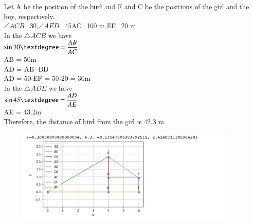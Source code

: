 \documentclass[journal,12pt,twocolumn]{IEEEtran}
\renewcommand\thesection{\arabic{section}}
\begin{document}
\begin{enumerate}[label=\thesection.\arabic*.,ref=\thesection.\theenumi]
\solution Let A be the position of the bird and E and C be the positions of the girl and the boy, respectively. \\

$\angle ACB$=30\textdegree ,$\angle AED$=45\textdegree AC=100 m,EF=20 m \\

In the $\triangle ACB$ we have\\

$ \sin 30\textdegree = \dfrac{AB}{AC}$ \\  

AB = 50m\\
AD = AB -BD\\
AD = 50-EF = 50-20 = 30m \\
In the $\triangle ADE$ we have\\

$ \sin 45\textdegree = \dfrac{AD}{AE}$ \\ 

AE = 43.2m \\
Therefore, the distance of bird from the girl is 42.3 m.\\
\begin{figure}
	\centering 
	\includegraphics[width=\columnwidth]{4.1}
	\caption{}
\end{figure} 


\end{enumerate}
\end{document}
